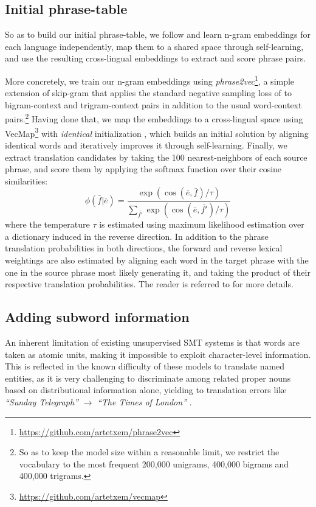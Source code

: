 \documentclass[11pt,a4paper]{article}
\begin{document}
\subsection{Initial phrase-table} \label{subsec:initial}

So as to build our initial phrase-table, we follow \citet{artetxe2018usmt} and learn n-gram embeddings for each language independently, map them to a shared space through self-learning, and use the resulting cross-lingual embeddings to extract and score phrase pairs.

More concretely, we train our n-gram embeddings using \textit{phrase2vec}\footnote{\url{https://github.com/artetxem/phrase2vec}}, a simple extension of skip-gram that applies the standard negative sampling loss of \citet{mikolov2013distributed} to bigram-context and trigram-context pairs in addition to the usual word-context pairs.\footnote{So as to keep the model size within a reasonable limit, we restrict the vocabulary to the most frequent 200,000 unigrams, 400,000 bigrams and 400,000 trigrams.} Having done that, we map the embeddings to a cross-lingual space using VecMap\footnote{\url{https://github.com/artetxem/vecmap}} with \textit{identical} initialization \citep{artetxe2018robust}, which builds an initial solution by aligning identical words and iteratively improves it through self-learning. Finally, we extract translation candidates by taking the 100 nearest-neighbors of each source phrase, and score them by applying the softmax function over their cosine similarities:
\[ \phi ( \bar{f} | \bar{e} ) = \frac{ \exp \left( \cos( \bar{e}, \bar{f} ) / \tau \right)}{\sum_{\bar{f'}} \exp \left(  \cos ( \bar{e}, \bar{f'} ) / \tau \right)} \]
where the temperature $\tau$ is estimated using maximum likelihood estimation over a dictionary induced in the reverse direction. In addition to the phrase translation probabilities in both directions, the forward and reverse lexical weightings are also estimated by aligning each word in the target phrase with the one in the source phrase most likely generating it, and taking the product of their respective translation probabilities. The reader is referred to \citet{artetxe2018usmt} for more details.

\subsection{Adding subword information} \label{subsec:subword}

An inherent limitation of existing unsupervised SMT systems is that words are taken as atomic units, making it impossible to exploit character-level information. This is reflected in the known difficulty of these models to translate named entities, as it is very challenging to discriminate among related proper nouns based on distributional information alone, yielding to translation errors like \textit{``Sunday Telegraph''} $\rightarrow$ \textit{``The Times of London''} \citep{artetxe2018usmt}.
\end{document}
